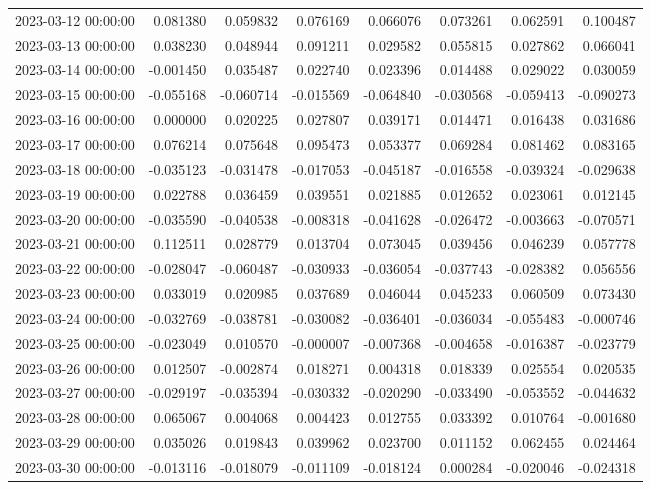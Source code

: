 \begin{tabular}{lrrrrrrr}
2023-03-12 00:00:00 & 0.081380 & 0.059832 & 0.076169 & 0.066076 & 0.073261 & 0.062591 & 0.100487 \\
2023-03-13 00:00:00 & 0.038230 & 0.048944 & 0.091211 & 0.029582 & 0.055815 & 0.027862 & 0.066041 \\
2023-03-14 00:00:00 & -0.001450 & 0.035487 & 0.022740 & 0.023396 & 0.014488 & 0.029022 & 0.030059 \\
2023-03-15 00:00:00 & -0.055168 & -0.060714 & -0.015569 & -0.064840 & -0.030568 & -0.059413 & -0.090273 \\
2023-03-16 00:00:00 & 0.000000 & 0.020225 & 0.027807 & 0.039171 & 0.014471 & 0.016438 & 0.031686 \\
2023-03-17 00:00:00 & 0.076214 & 0.075648 & 0.095473 & 0.053377 & 0.069284 & 0.081462 & 0.083165 \\
2023-03-18 00:00:00 & -0.035123 & -0.031478 & -0.017053 & -0.045187 & -0.016558 & -0.039324 & -0.029638 \\
2023-03-19 00:00:00 & 0.022788 & 0.036459 & 0.039551 & 0.021885 & 0.012652 & 0.023061 & 0.012145 \\
2023-03-20 00:00:00 & -0.035590 & -0.040538 & -0.008318 & -0.041628 & -0.026472 & -0.003663 & -0.070571 \\
2023-03-21 00:00:00 & 0.112511 & 0.028779 & 0.013704 & 0.073045 & 0.039456 & 0.046239 & 0.057778 \\
2023-03-22 00:00:00 & -0.028047 & -0.060487 & -0.030933 & -0.036054 & -0.037743 & -0.028382 & 0.056556 \\
2023-03-23 00:00:00 & 0.033019 & 0.020985 & 0.037689 & 0.046044 & 0.045233 & 0.060509 & 0.073430 \\
2023-03-24 00:00:00 & -0.032769 & -0.038781 & -0.030082 & -0.036401 & -0.036034 & -0.055483 & -0.000746 \\
2023-03-25 00:00:00 & -0.023049 & 0.010570 & -0.000007 & -0.007368 & -0.004658 & -0.016387 & -0.023779 \\
2023-03-26 00:00:00 & 0.012507 & -0.002874 & 0.018271 & 0.004318 & 0.018339 & 0.025554 & 0.020535 \\
2023-03-27 00:00:00 & -0.029197 & -0.035394 & -0.030332 & -0.020290 & -0.033490 & -0.053552 & -0.044632 \\
2023-03-28 00:00:00 & 0.065067 & 0.004068 & 0.004423 & 0.012755 & 0.033392 & 0.010764 & -0.001680 \\
2023-03-29 00:00:00 & 0.035026 & 0.019843 & 0.039962 & 0.023700 & 0.011152 & 0.062455 & 0.024464 \\
2023-03-30 00:00:00 & -0.013116 & -0.018079 & -0.011109 & -0.018124 & 0.000284 & -0.020046 & -0.024318 \\

\end{tabular}
